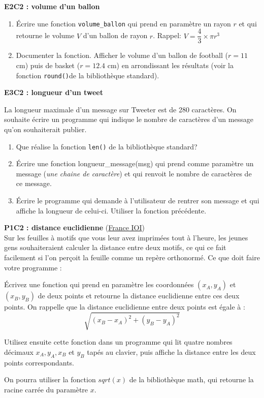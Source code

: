 \documentclass[11pt,french]{article}
\begin{document}
\noindent\textbf{E2C2 : volume d'un ballon}
\begin{enumerate}
\item \'Ecrire une fonction \texttt{volume\_ballon} qui prend en paramètre un rayon \(r\)
et qui retourne le volume \(V\) d'un ballon de rayon \(r\). Rappel:
\(V=\dfrac{4}{3}\times\pi r^{3}\)
\item Documenter la fonction. Afficher le volume d'un ballon de football
(\(r=11\) cm) puis de basket (\(r=12.4\) cm) en arrondissant les
résultats (voir la fonction \texttt{round()}de la bibliothèque
standard).
\end{enumerate}
\textbf{E3C2 : longueur d'un tweet}\par
La longueur maximale d'un message sur Tweeter est de 280 caractères. On
souhaite écrire un programme qui indique le nombre de caractères d'un
message qu'on souhaiterait publier.
\begin{enumerate}
\item Que réalise la fonction \texttt{len()} de la bibliothèque standard?
\item \'Ecrire une fonction longueur\_message(msg) qui prend comme paramètre
un message (\emph{une chaine de caractère}) et qui renvoit le nombre de
caractères de ce message. 
\item \'Ecrire le programme qui demande à
l'utilisateur de rentrer son message et qui affiche la longueur de
celui-ci. Utiliser la fonction précédente.
\end{enumerate}
\textbf{P1C2 : distance euclidienne}
(\href{http://www.france-ioi.org/}{France IOI})\\
Sur les feuilles à motifs que vous leur avez imprimées tout à l'heure,
les jeunes gens souhaiteraient calculer la distance entre deux motifs,
ce qui ce fait facilement si l'on perçoit la feuille comme un repère
orthonormé. Ce que doit faire votre programme :

Écrivez une fonction qui prend en paramètre les coordonnées
\((x_A,y_A)\) et \((x_B,y_B)\) de deux points et retourne la distance
euclidienne entre ces deux points. On rappelle que la distance
euclidienne entre deux points est égale à :
\[\sqrt{(x_B−x_A)^2+(y_B−y_A)^2}\]

Utilisez ensuite cette fonction dans un programme qui lit quatre nombres
décimaux \(x_A, y_A, x_B\) et \(y_B\) tapés au clavier, puis affiche la
distance entre les deux points correspondants.

On pourra utiliser la fonction \(sqrt(x)\) de la bibliothèque math, qui
retourne la racine carrée du paramètre \(x\).
\end{document}
